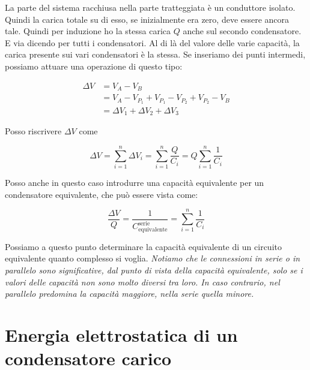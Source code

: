 \begin{figure}[htpb]
\end{figure}
\FloatBarrier

La parte del sistema racchiusa nella parte tratteggiata è un conduttore isolato. Quindi la carica totale su di esso, se inizialmente era zero, deve essere ancora tale.
Quindi per induzione ho la stessa carica $Q$ anche sul secondo condensatore. E via dicendo per tutti i condensatori.  Al di là del valore delle varie capacità, la carica presente sui vari condensatori è la stessa. Se inseriamo dei punti intermedi, possiamo attuare una operazione di questo tipo:

\begin{align*}
	\Delta V &= V_A-V_B \\
	&= V_A-V_{P_1}+V_{P_1} -V_{P_2}+V_{P_2} - V_B \\
	&= \Delta V_1 + \Delta V_2 + \Delta V_3
\end{align*}

Posso riscrivere $ \Delta V $ come

\[
	\Delta V = \sum_{i=1}^n \Delta V_i = \sum_{i=1}^n \frac{Q}{C_i} = Q \sum_{i=1}^n \frac{1}{C_i}
\]

Posso anche in questo caso introdurre una capacità equivalente per un condensatore equivalente, che può essere vista come:

\[
	\frac{\Delta V}{Q} = \boxed{\frac{1}{C_{\text{equivalente}}^{\text{serie}}} = \sum_{i=1}^n \frac{1}{C_i}}
\]

Possiamo a questo punto determinare la capacità equivalente di un circuito equivalente quanto complesso si voglia.
\emph{Notiamo che le connessioni in serie o in parallelo sono significative, dal punto di vista della capacità equivalente, solo se i valori delle capacità non sono molto diversi tra loro. In caso contrario, nel parallelo predomina la capacità maggiore, nella serie quella minore.}

\section{Energia elettrostatica di un condensatore carico}

